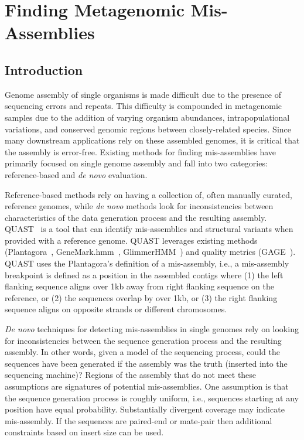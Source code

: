 \renewcommand{\thechapter}{5}

\chapter{Finding Metagenomic Mis-Assemblies}

\section{Introduction}

Genome assembly of single organisms is made difficult due to the presence of sequencing errors and repeats.
This difficulty is compounded in metagenomic samples due to the addition of varying organism abundances, intrapopulational variations, and conserved genomic regions between closely-related species.
Since many downstream applications rely on these assembled genomes, it is critical that the assembly is error-free.
Existing methods for finding mis-assemblies have primarily focused on single genome assembly and fall into two categories: reference-based and \emph{de novo} evaluation.

Reference-based methods rely on having a collection of, often manually curated, reference genomes, while \emph{de novo} methods look for inconsistencies between characteristics of the data generation process and the resulting assembly.
QUAST~\cite{gurevich2013quast} is a tool that can identify mis-assemblies and structural variants when provided with a reference genome.
QUAST leverages existing methods (Plantagora~\cite{barthelson2011plantagora},
GeneMark.hmm~\cite{lukashin1998genemark}, GlimmerHMM~\cite{majoros2004tigrscan}) and quality metrics (GAGE~\cite{salzberg2011gage}).
QUAST uses the Plantagora’s definition of a mis-assembly,
i.e., a mis-assembly breakpoint is defined as a position in the assembled contigs where (1) the left flanking
sequence aligns over 1kb away from right flanking sequence on the reference, or (2) the sequences overlap by
over 1kb, or (3) the right flanking sequence aligns on opposite strands or different chromosomes.

\emph{De novo} techniques for detecting mis-assemblies in single genomes rely on looking for inconsistencies between the sequence generation process and the resulting assembly.
In other words, given a model of the sequencing process, could the sequences have been generated if the assembly was the truth (inserted into the sequencing machine)?
Regions of the assembly that do not meet these assumptions are signatures of potential mis-assemblies.
One assumption is that the sequence generation process is roughly uniform, i.e., sequences starting at any position have equal probability.
Substantially divergent coverage may indicate mis-assembly.
If the sequences are paired-end or mate-pair then additional constraints based on insert size can be used.

